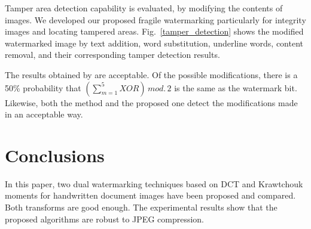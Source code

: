 \documentclass[runningheads]{llncs}
\begin{document}
Tamper area detection capability is evaluated, by modifying the contents of images. We developed our proposed fragile watermarking particularly for integrity images and locating tampered areas. Fig.~\ref{tamper_detection} shows the modified watermarked image by text addition, word substitution, underline words, content removal, and their corresponding tamper detection results.

The results obtained by \cite{shivani2017dual} are acceptable. Of the possible modifications, there is a 50\% probability that $\left( \sum_{m=1}^{5}XOR\right)\,  mod.\, 2$ is the same as the watermark bit. Likewise, both the \cite{liu2018blind} method and the proposed one detect the modifications made in an acceptable way.

\section{Conclusions}
In this paper, two dual watermarking techniques based on DCT and Krawtchouk moments for handwritten document images have been proposed and compared. Both transforms are good enough. The experimental results show that the proposed algorithms are robust to JPEG compression.

%
%


%
\end{document}
